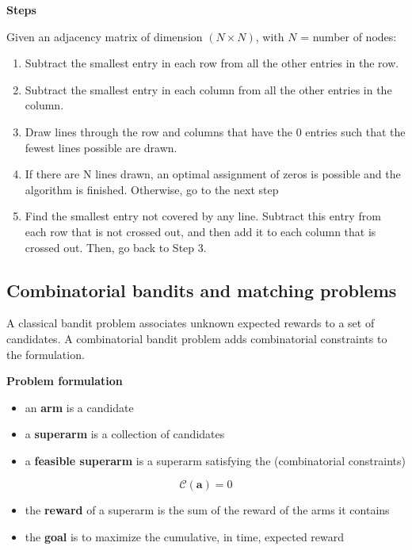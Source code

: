 \documentclass[10pt,a4paper]{article}
\begin{document}
\textbf{Steps}

Given an adjacency matrix of dimension $(N \times N)$, with $N$ = number of nodes:
\begin{shaded}
\begin{enumerate}
\item Subtract the smallest entry in each row from all the other entries in the row.
\item Subtract the smallest entry in each column from all the other entries in the column.
\item Draw lines through the row and columns that have the 0 entries such that the fewest lines possible are drawn.
\item If there are N lines drawn, an optimal assignment of zeros is possible and the algorithm is finished. Otherwise, go to the next step
\item Find the smallest entry not covered by any line. Subtract this entry from each row that is not crossed out, and then add it to each column that is crossed out. Then, go back to Step 3.
\end{enumerate}
\end{shaded}

\subsection{Combinatorial bandits and matching problems}\label{combinatorial-bandits-and-matching-problems}

A classical bandit problem associates unknown expected rewards to a set of candidates. A combinatorial bandit problem adds combinatorial constraints to the formulation.

\textbf{Problem formulation}

\begin{itemize}
\item an \textbf{arm} is a candidate
\item a \textbf{superarm} is a collection of candidates
\item a \textbf{feasible superarm} is a superarm satisfying the (combinatorial constraints)
\end{itemize}

$$\mathscr{C}(\mathbf{a})= 0$$

\begin{itemize}

\item the \textbf{reward} of a superarm is the sum of the reward of the arms it contains
\item the \textbf{goal} is to maximize the cumulative, in time, expected reward
\end{itemize}
\end{document}
